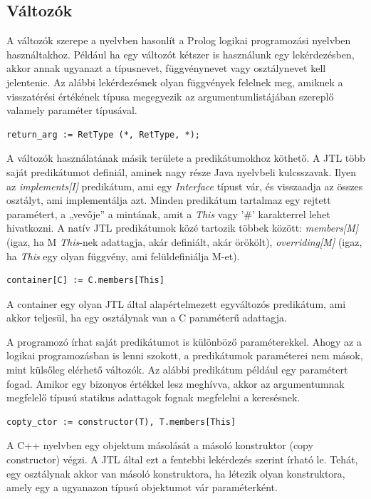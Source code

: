 \documentclass[a4paper,12pt]{report}
\begin{document}
\subsection{Változók}
A változók szerepe a nyelvben hasonlít a Prolog logikai programozási nyelvben használtakhoz. Például ha egy változót kétszer is használunk egy lekérdezésben, akkor annak ugyanazt a típusnevet, függvénynevet vagy osztálynevet kell jelentenie. Az alábbi lekérdezésnek olyan függvények felelnek meg, amiknek a visszatérési értékének típusa megegyezik az argumentumlistájában szereplő valamely paraméter típusával.
\begin{verbatim}
return_arg := RetType (*, RetType, *);
\end{verbatim}
\par A változók használatának másik területe a predikátumokhoz köthető. A JTL több saját predikátumot definiál, aminek nagy része Java nyelvbeli kulcsszavak. Ilyen az \textit{implements[I]} predikátum, ami egy \textit{Interface} típust vár, és visszaadja az összes osztályt, ami implementálja azt. Minden predikátum tartalmaz egy rejtett paramétert, a „vevője” a mintának, amit a \textit{This} vagy ’\#’ karakterrel lehet hivatkozni. A natív JTL predikátumok közé tartozik többek között: \textit{members[M]} (igaz, ha M \textit{This}-nek adattagja, akár definiált, akár örökölt), \textit{overriding[M]} (igaz, ha \textit{This} egy olyan függvény, ami felüldefiniálja M-et).
\begin{verbatim}
container[C] := C.members[This]
\end{verbatim}
\par A container egy olyan JTL által alapértelmezett egyváltozós predikátum, ami akkor teljesül, ha egy osztálynak van a C paraméterű adattagja.
\par A programozó írhat saját predikátumot is különböző paraméterekkel. Ahogy az a logikai programozásban is lenni szokott, a predikátumok paraméterei nem mások, mint külsőleg elérhető változók. Az alábbi predikátum például egy paramétert fogad. Amikor egy bizonyos értékkel lesz meghívva, akkor az argumentumnak megfelelő típusú statikus adattagok fognak megfelelni a keresésnek.
\begin{verbatim}
copty_ctor := constructor(T), T.members[This]
\end{verbatim}
A C++ nyelvben egy objektum másolását a másoló konstruktor (copy constructor) végzi. A JTL által ezt a fentebbi lekérdezés szerint írható le. Tehát, egy osztálynak akkor van másoló konstruktora, ha létezik olyan konstruktora, amely egy a ugyanazon típusú objektumot vár paraméterként.
\end{document}
